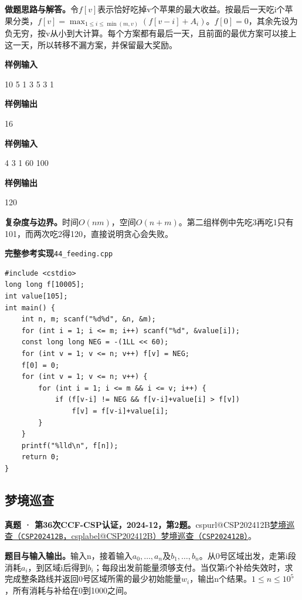 \documentclass[UTF8,11pt,a4paper,fontset=none]{ctexart}
\makeatletter
\newcommand{\csp}[2]{\ifcsname cspurl@#1\endcsname\href{\csname cspurl@#1\endcsname}{#2（\texttt{#1}，\csname csplabel@#1\endcsname）}\else\href{https://oj.shumeng.tech/p/#1}{#2（\texttt{#1}）}\fi}
\makeatother
\begin{document}
\noindent\textbf{做题思路与解答。}令$f[v]$表示恰好吃掉v个苹果的最大收益。按最后一天吃i个苹果分类，$f[v]=\max_{1\le i\le\min(m,v)}(f[v-i]+A_i)$。$f[0]=0$，其余先设为负无穷，按v从小到大计算。每个方案都有最后一天，且前面的最优方案可以接上这一天，所以转移不漏方案，并保留最大奖励。
\begin{tcolorbox}[samplebox,title={输入输出样例}]
\textbf{样例输入}
\begin{Sample}
10 5
1 3 5 3 1
\end{Sample}
\tcblower
\textbf{样例输出}
\begin{Sample}
16
\end{Sample}
\end{tcolorbox}
\begin{tcolorbox}[samplebox,title={输入输出样例}]
\textbf{样例输入}
\begin{Sample}
4 3
1 60 100
\end{Sample}
\tcblower
\textbf{样例输出}
\begin{Sample}
120
\end{Sample}
\end{tcolorbox}

\noindent\textbf{复杂度与边界。}时间$O(nm)$，空间$O(n+m)$。第二组样例中先吃3再吃1只有101，而两次吃2得120，直接说明贪心会失败。
\par\noindent\begin{minipage}{\linewidth}
\textbf{完整参考实现}\quad\texttt{44\_feeding.cpp}
\begin{lstlisting}
#include <cstdio>
long long f[10005];
int value[105];
int main() {
    int n, m; scanf("%d%d", &n, &m);
    for (int i = 1; i <= m; i++) scanf("%d", &value[i]);
    const long long NEG = -(1LL << 60);
    for (int v = 1; v <= n; v++) f[v] = NEG;
    f[0] = 0;
    for (int v = 1; v <= n; v++) {
        for (int i = 1; i <= m && i <= v; i++) {
            if (f[v-i] != NEG && f[v-i]+value[i] > f[v])
                f[v] = f[v-i]+value[i];
        }
    }
    printf("%lld\n", f[n]);
    return 0;
}
\end{lstlisting}
\end{minipage}\par

\subsection{梦境巡查}
\textbf{真题 · 第36次CCF-CSP认证，2024-12，第2题。}\csp{CSP202412B}{梦境巡查}。

\noindent\textbf{题目与输入输出。}输入n，接着输入$a_0,\ldots,a_n$及$b_1,\ldots,b_n$。从0号区域出发，走第i段消耗$a_i$，到区域i后得到$b_i$；每段出发前能量须够支付。当仅第i个补给失效时，求完成整条路线并返回0号区域所需的最少初始能量$w_i$，输出n个结果。$1\le n\le10^5$，所有消耗与补给在0到1000之间。
\end{document}
